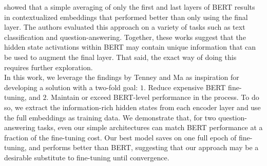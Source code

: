 \cite{ma2019universal} showed that a simple averaging of only the first and last layers of BERT results in contextualized embeddings that performed better than only using the final layer. The authors evaluated this approach on a variety of tasks such as text classification and question-answering. Together, these works suggest that the hidden state activations within BERT may contain unique information that can be used to augment the final layer. That said, the exact way of doing this requires further exploration. \\

In this work, we leverage the findings by Tenney and Ma as inspiration for developing a solution with a two-fold goal: $1.$ Reduce expensive BERT fine-tuning, and $2.$ Maintain or exceed BERT-level performance in the process. To do so, we extract the information-rich hidden states from each encoder layer and use the full embeddings as training data. We demonstrate that, for two question-answering tasks, even our simple architectures can match BERT performance at a fraction of the fine-tuning cost. Our best model saves on one full epoch of fine-tuning, and performs better than BERT, suggesting that our approach may be a desirable substitute to fine-tuning until convergence.
